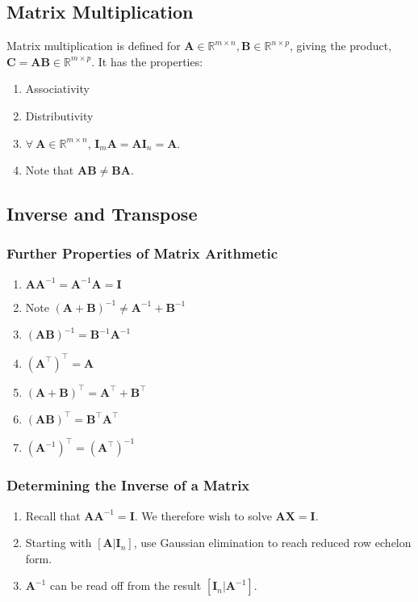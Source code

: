 \documentclass[10pt,twoside,twocolumn]{article}
\newcommand{\R}[0]{\mathds{R}} %
\begin{document}
\subsection{Matrix Multiplication}

Matrix multiplication is defined for $\mathbf{A}\in\R^{m\times n},\mathbf{B}\in\R^{n\times p}$,
giving the product, $\mathbf{C}=\mathbf{AB}\in\R^{m\times p}$. It
has the properties: 
\begin{enumerate}
\item Associativity 
\item Distributivity 
\item $\forall\:\mathbf{A}\in\R^{m\times n}$, $\mathbf{I}_{m}\mathbf{A}=\mathbf{A}\mathbf{I}_{n}=\mathbf{A}$. 
\item Note that $\mathbf{AB}\neq\mathbf{BA}$. 
\end{enumerate}

\subsection{Inverse and Transpose}


\subsubsection{Further Properties of Matrix Arithmetic}
\begin{enumerate}
\item $\mathbf{A}\mathbf{A}^{-1}=\mathbf{A}^{-1}\mathbf{A}=\mathbf{I}$ 
\item Note $\left(\mathbf{A}+\mathbf{B}\right)^{-1}\neq\mathbf{A}^{-1}+\mathbf{B}^{-1}$ 
\item $\left(\mathbf{A}\mathbf{B}\right)^{-1}=\mathbf{B}^{-1}\mathbf{A}^{-1}$\\

\item $\left(\mathbf{A}^{\top}\right)^{\top}=\mathbf{A}$ 
\item $\left(\mathbf{A}+\mathbf{B}\right)^{\top}=\mathbf{A}^{\top}+\mathbf{B}^{\top}$ 
\item $\left(\mathbf{A}\mathbf{B}\right)^{\top}=\mathbf{B}^{\top}\mathbf{A}^{\top}$\\

\item $\left(\mathbf{A}^{-1}\right)^{\top}=\left(\mathbf{A}^{\top}\right)^{-1}$ 
\end{enumerate}

\subsubsection{Determining the Inverse of a Matrix}
\begin{enumerate}
\item Recall that $\mathbf{A}\mathbf{A}^{-1}=\mathbf{I}$. We therefore
wish to solve $\mathbf{A}\mathbf{X}=\mathbf{I}$. 
\item Starting with $\left[\mathbf{A}|\mathbf{I}_{n}\right]$, use Gaussian
elimination to reach reduced row echelon form. 
\item $\mathbf{A}^{-1}$ can be read off from the result $\left[\mathbf{I}_{n}|\mathbf{A}^{-1}\right]$. 
\end{enumerate}
\end{document}
